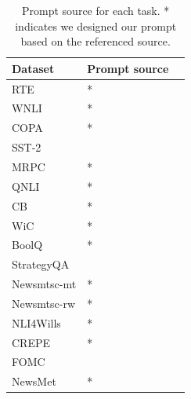 \documentclass[letterpaper]{article} %
\begin{document}
\begin{table}[h!]
\centering \small
\begin{tabular}{l||ll}
Dataset & Prompt source  \\ \hline \hline
RTE &  \citet{Bang2023}* \\
WNLI &  \citet{Bang2023}* \\
COPA &  \citet{Bang2023}*\\
SST-2 & \citet{openai2023b}\\
MRPC &  \citet{openai2023b}*  \\
QNLI &  \citet{Bang2023}* \\
CB &  \citet{Bang2023}*\\
WiC &  \citet{openai2023b}* \\
BoolQ &  \citet{Qin2023}* \\
\hline \hline
StrategyQA &   \citet{Qin2023} \\
Newsmtsc-mt & \citet{openai2023b}* \\
Newsmtsc-rw & \citet{openai2023b}* \\
NLI4Wills &  \citet{Bang2023}* \\
CREPE &   \citet{openai2023b}* \\
FOMC &  \citet{shah2023} \\
NewsMet& \citet{Bang2023}* 
\end{tabular}
\caption[]{Prompt source for each task. * indicates we designed our prompt based on the referenced source.}
\label{fig-prompt-source-llm}
\end{table}

\end{document}

